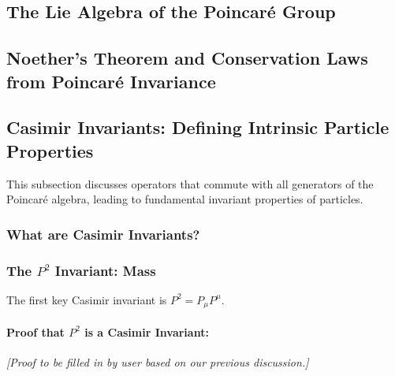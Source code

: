 \documentclass{amsart}
\theoremstyle{definition}
\theoremstyle{remark}
\begin{document}
\subsection{The Lie Algebra of the Poincaré Group}
\label{subsec:poincare_algebra}

\subsection{Noether's Theorem and Conservation Laws from Poincaré Invariance}
\label{subsec:noether_poincare}

\subsection{Casimir Invariants: Defining Intrinsic Particle Properties}
\label{subsec:casimir_invariants}
This subsection discusses operators that commute with all generators of the Poincaré algebra, leading to fundamental invariant properties of particles.

\subsubsection{What are Casimir Invariants?}
\label{subsubsec:what_are_casimirs}

\subsubsection{The $P^2$ Invariant: Mass}
\label{subsubsec:p_squared_invariant}
The first key Casimir invariant is $P^2 = P_\mu P^\mu$.

\paragraph{Proof that $P^2$ is a Casimir Invariant:}
\textit{[Proof to be filled in by user based on our previous discussion.]}
\end{document}
